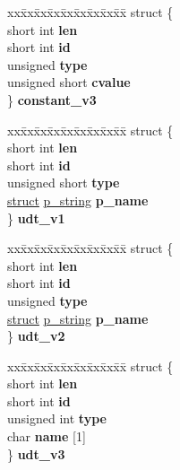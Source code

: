 \begin{DoxyCompactItemize}
\begin{tabbing}
\end{tabbing}\item 
\mbox{\label{unioncodeview__symbol_a3637a03316817609602a9d5e578ba9eb}} 
\begin{tabbing}
xx\=xx\=xx\=xx\=xx\=xx\=xx\=xx\=xx\=\kill
struct \{\\
\>short int {\bfseries len}\\
\>short int {\bfseries id}\\
\>unsigned {\bfseries type}\\
\>unsigned short {\bfseries cvalue}\\
\} {\bfseries constant\_v3}\\

\end{tabbing}\item 
\mbox{\label{unioncodeview__symbol_a63296b8e301b7bc23bcb1246e7ff5927}} 
\begin{tabbing}
xx\=xx\=xx\=xx\=xx\=xx\=xx\=xx\=xx\=\kill
struct \{\\
\>short int {\bfseries len}\\
\>short int {\bfseries id}\\
\>unsigned short {\bfseries type}\\
\>\hyperlink{interfacestruct}{struct} \hyperlink{structp__string}{p\_string} {\bfseries p\_name}\\
\} {\bfseries udt\_v1}\\

\end{tabbing}\item 
\mbox{\label{unioncodeview__symbol_a2611b4306c302976ba08d3671f25a0a5}} 
\begin{tabbing}
xx\=xx\=xx\=xx\=xx\=xx\=xx\=xx\=xx\=\kill
struct \{\\
\>short int {\bfseries len}\\
\>short int {\bfseries id}\\
\>unsigned {\bfseries type}\\
\>\hyperlink{interfacestruct}{struct} \hyperlink{structp__string}{p\_string} {\bfseries p\_name}\\
\} {\bfseries udt\_v2}\\

\end{tabbing}\item 
\mbox{\label{unioncodeview__symbol_a5c54612d0990f7303a05127edb994fbf}} 
\begin{tabbing}
xx\=xx\=xx\=xx\=xx\=xx\=xx\=xx\=xx\=\kill
struct \{\\
\>short int {\bfseries len}\\
\>short int {\bfseries id}\\
\>unsigned int {\bfseries type}\\
\>char {\bfseries name} \mbox{[}1\mbox{]}\\
\} {\bfseries udt\_v3}\\


\end{tabbing}
\end{DoxyCompactItemize}
